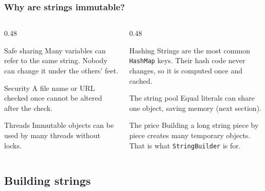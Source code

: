 \documentclass[aspectratio=169,10pt,compress]{beamer}
\begin{document}
\begin{frame}[t,fragile] \frametitle{Why are strings immutable?}
  \begin{columns}[T]
    \begin{column}{0.48\textwidth}
      \begin{block}{Safe sharing}
        \small Many variables can refer to the same string. Nobody can change it under the others' feet.
      \end{block}
      \begin{block}{Security}
        \small A file name or URL checked once cannot be altered after the check.
      \end{block}
      \begin{block}{Threads}
        \small Immutable objects can be used by many threads without locks.
      \end{block}
    \end{column}
    \begin{column}{0.48\textwidth}
      \begin{block}{Hashing}
        \small Strings are the most common \texttt{HashMap} keys. Their hash code never changes,
        so it is computed once and cached.
      \end{block}
      \begin{block}{The string pool}
        \small Equal literals can share one object, saving memory (next section).
      \end{block}
      \begin{alertblock}{The price}
        \small Building a long string piece by piece creates many temporary objects.
        That is what \texttt{StringBuilder} is for.
      \end{alertblock}
    \end{column}
  \end{columns}
\end{frame}

\subsection[Builder]{Building strings}
\end{document}
